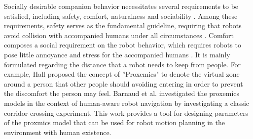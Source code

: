 \documentclass[letterpaper, 10 pt, conference]{ieeeconf}
\newcommand{\todohere}[1]{\hl{(\textbf{TODO:} #1)}}
\begin{document}
	Socially desirable companion behavior necessitates several requirements to be satisfied, including safety, comfort, naturalness and sociability \cite{kruse2013human}.
	Among these requirements, safety serves as the fundamental guideline, requiring that robots avoid collision with accompanied humans under all circumstances \cite{hoeller2007accompanying,fox1997dynamic,svenstrup2010trajectory}.
	Comfort composes a social requirement on the robot behavior, which requires robots to pose little annoyance and stress for the accompanied humans \cite{kruse2013human}.
	It is mainly formulated regarding the distance that a robot needs to keep from people.
	For example, Hall \cite{hall1968proxemics} proposed the concept of ''Proxemics" to denote the virtual zone around a person that other people should avoiding entering in order to prevent the discomfort the person may feel.
	Barnaud et al.\cite{barnaud2014proxemics} investigated the proxemics models in the context of human-aware robot navigation by investigating a classic corridor-crossing experiment.
	This work provides a tool for designing parameters of the proxmics model that can be used for robot motion planning in the environment with human existence.
	
	
\end{document}
